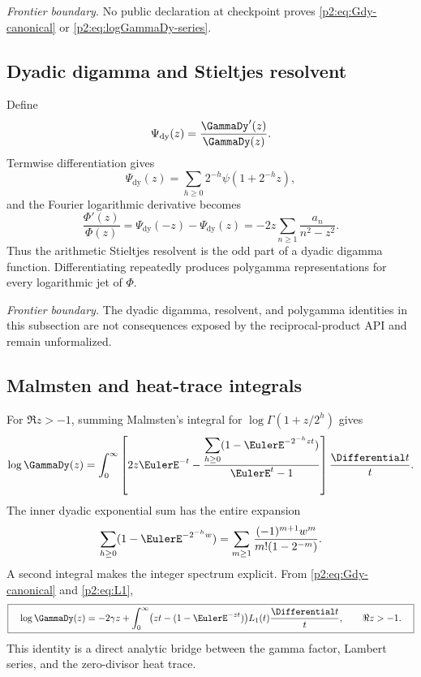 \documentclass[11pt]{article}
\theoremstyle{definition}
\theoremstyle{remark}
\begin{document}
\emph{Frontier boundary.}  No public declaration at checkpoint
 proves
\eqref{p2:eq:Gdy-canonical} or \eqref{p2:eq:logGammaDy-series}.

\subsection{Dyadic digamma and Stieltjes resolvent}

Define
\begin{equation}
 \Psi_{\mathrm{dy}}(z)=\frac{\GammaDy'(z)}{\GammaDy(z)}.
\end{equation}
Termwise differentiation gives
\begin{equation}
 \Psi_{\mathrm{dy}}(z)=\sum_{h\ge0}2^{-h}\psi(1+2^{-h}z),                 \label{p2:eq:dyadic-digamma}
\end{equation}
and the Fourier logarithmic derivative becomes
\begin{equation}
 \boxed{\quad
 \frac{\Phi'(z)}{\Phi(z)}
 =\Psi_{\mathrm{dy}}(-z)-\Psi_{\mathrm{dy}}(z)
 =-2z\sum_{n\ge1}\frac{a_n}{n^2-z^2}.
 \quad}                                                  \label{p2:eq:digamma-resolvent}
\end{equation}
Thus the arithmetic Stieltjes resolvent is the odd part of a dyadic digamma function.
Differentiating repeatedly produces polygamma representations for every logarithmic jet of
$\Phi$.

\emph{Frontier boundary.}  The dyadic digamma, resolvent, and polygamma identities in this
subsection are not consequences exposed by the reciprocal-product API and remain
unformalized.

\subsection{Malmsten and heat-trace integrals}

For $\Re z>-1$, summing Malmsten's integral for $\log\Gamma(1+z/2^h)$ gives
\begin{equation}
 \log\GammaDy(z)=\int_0^\infty
 \left[
 2z\EulerE^{-t}-\frac{\displaystyle\sum_{h\ge0}
 (1-\EulerE^{-2^{-h}zt})}{\EulerE^t-1}
 \right]\frac{\Differential t}{t}.                               \label{p2:eq:GammaDy-Malmsten}
\end{equation}
The inner dyadic exponential sum has the entire expansion
\begin{equation}
 \sum_{h\ge0}(1-\EulerE^{-2^{-h}w})
 =\sum_{m\ge1}\frac{(-1)^{m+1}w^m}{m!(1-2^{-m})}.       \label{p2:eq:dyadic-exponential-sum}
\end{equation}
A second integral makes the integer spectrum explicit.  From
\eqref{p2:eq:Gdy-canonical} and \eqref{p2:eq:L1},
\begin{equation}
 \boxed{\quad
 \log\GammaDy(z)
 =-2\gamma z+\int_0^\infty
 \bigl(zt-(1-\EulerE^{-zt})\bigr)L_1(t)\frac{\Differential t}{t},
 \qquad \Re z>-1.
 \quad}                                                  \label{p2:eq:GammaDy-heat-integral}
\end{equation}
This identity is a direct analytic bridge between the gamma factor, Lambert series, and the
zero-divisor heat trace.
\end{document}

